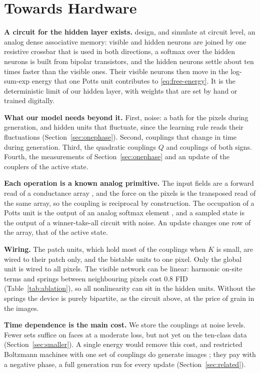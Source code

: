 \documentclass{article}
\newif\ifshownotes
\newcommand{\budget}[1]{\ifshownotes{\noindent\small\itshape\textcolor{notegray}{[Budget: #1]}\par}\fi}
\newcommand{\todo}[1]{\ifshownotes\textcolor{tbdcolor}{[TODO: #1]}\fi}
\begin{document}
\section{Towards Hardware}
\label{sec:hardware}
\budget{0.6 page; high level, no circuit design}

\textbf{A circuit for the hidden layer exists.}
\citet{bacvanski2025dense} design, and simulate at circuit level, an analog
dense associative memory: visible and hidden neurons are joined by one
resistive crossbar that is used in both directions, a softmax over the hidden
neurons is built from bipolar transistors, and the hidden neurons settle
about ten times faster than the visible ones. Their visible neurons then move
in the log-sum-exp energy that one Potts unit contributes to
\eqref{eq:free-energy}. It is the deterministic limit of our hidden layer,
with weights that are set by hand or trained digitally.
\todo{check these statements against the full paper before submission.}

\textbf{What our model needs beyond it.}
First, noise: a bath for the pixels during generation, and hidden units that
fluctuate, since the learning rule reads their fluctuations
(Section~\ref{sec:onephase}). Second, couplings that change in time during
generation. Third, the quadratic couplings $Q$ and couplings of both signs.
Fourth, the measurements of Section~\ref{sec:onephase} and an update of the
couplers of the active state.

\textbf{Each operation is a known analog primitive.}
The input fields are a forward read of a conductance array
\citep{wan2022neurram}, and the force on the pixels is the transposed read of
the same array, so the coupling is reciprocal by construction. The occupation
of a Potts unit is the output of an analog softmax element
\citep{elfadel1993softmax}, and a sampled state is the output of a
winner-take-all circuit with noise. An update changes one row of the array,
that of the active state.

\textbf{Wiring.}
The patch units, which hold most of the couplings when $K$ is small, are
wired to their patch only, and the bistable units to one pixel. Only the
global unit is wired to all pixels. The visible network can be linear:
harmonic on-site terms and springs between neighbouring pixels cost 0.8 FID
(Table~\ref{tab:ablation}), so all nonlinearity can sit in the hidden units.
Without the springs the device is purely bipartite, as the circuit above, at
the price of grain in the images.

\textbf{Time dependence is the main cost.}
We store the couplings at \nSlices{} noise levels. Fewer sets suffice on
faces at a moderate loss, but not yet on the ten-class data
(Section~\ref{sec:smaller}). A single energy would remove this cost, and
restricted Boltzmann machines with one set of couplings do generate images
\citep{liao2022gaussian}; they pay with a negative phase, a full generation
run for every update (Section~\ref{sec:related}).
\end{document}
